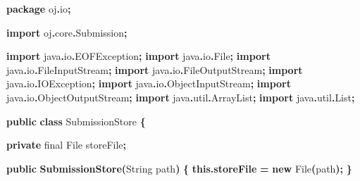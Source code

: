 \documentclass[
  11pt,
]{ctexart}
\newenvironment{Shaded}{\begin{snugshade}}{\end{snugshade}}
\newcommand{\BuiltInTok}[1]{#1}
\newcommand{\DataTypeTok}[1]{\textcolor[rgb]{0.13,0.29,0.53}{#1}}
\newcommand{\FunctionTok}[1]{\textcolor[rgb]{0.13,0.29,0.53}{\textbf{#1}}}
\newcommand{\ImportTok}[1]{#1}
\newcommand{\KeywordTok}[1]{\textcolor[rgb]{0.13,0.29,0.53}{\textbf{#1}}}
\newcommand{\NormalTok}[1]{#1}
\newcommand{\OperatorTok}[1]{\textcolor[rgb]{0.81,0.36,0.00}{\textbf{#1}}}
\begin{document}
\begin{Shaded}
\begin{Highlighting}[]
\KeywordTok{package}\ImportTok{ oj}\OperatorTok{.}\ImportTok{io}\OperatorTok{;}

\KeywordTok{import} \ImportTok{oj}\OperatorTok{.}\ImportTok{core}\OperatorTok{.}\ImportTok{Submission}\OperatorTok{;}

\KeywordTok{import} \ImportTok{java}\OperatorTok{.}\ImportTok{io}\OperatorTok{.}\ImportTok{EOFException}\OperatorTok{;}
\KeywordTok{import} \ImportTok{java}\OperatorTok{.}\ImportTok{io}\OperatorTok{.}\ImportTok{File}\OperatorTok{;}
\KeywordTok{import} \ImportTok{java}\OperatorTok{.}\ImportTok{io}\OperatorTok{.}\ImportTok{FileInputStream}\OperatorTok{;}
\KeywordTok{import} \ImportTok{java}\OperatorTok{.}\ImportTok{io}\OperatorTok{.}\ImportTok{FileOutputStream}\OperatorTok{;}
\KeywordTok{import} \ImportTok{java}\OperatorTok{.}\ImportTok{io}\OperatorTok{.}\ImportTok{IOException}\OperatorTok{;}
\KeywordTok{import} \ImportTok{java}\OperatorTok{.}\ImportTok{io}\OperatorTok{.}\ImportTok{ObjectInputStream}\OperatorTok{;}
\KeywordTok{import} \ImportTok{java}\OperatorTok{.}\ImportTok{io}\OperatorTok{.}\ImportTok{ObjectOutputStream}\OperatorTok{;}
\KeywordTok{import} \ImportTok{java}\OperatorTok{.}\ImportTok{util}\OperatorTok{.}\ImportTok{ArrayList}\OperatorTok{;}
\KeywordTok{import} \ImportTok{java}\OperatorTok{.}\ImportTok{util}\OperatorTok{.}\ImportTok{List}\OperatorTok{;}

\KeywordTok{public} \KeywordTok{class}\NormalTok{ SubmissionStore }\OperatorTok{\{}

    \KeywordTok{private} \DataTypeTok{final} \BuiltInTok{File}\NormalTok{ storeFile}\OperatorTok{;}

    \KeywordTok{public} \FunctionTok{SubmissionStore}\OperatorTok{(}\BuiltInTok{String}\NormalTok{ path}\OperatorTok{)} \OperatorTok{\{}
        \KeywordTok{this}\OperatorTok{.}\FunctionTok{storeFile} \OperatorTok{=} \KeywordTok{new} \BuiltInTok{File}\OperatorTok{(}\NormalTok{path}\OperatorTok{);}
    \OperatorTok{\}}


\end{Highlighting}
\end{Shaded}
\end{document}
